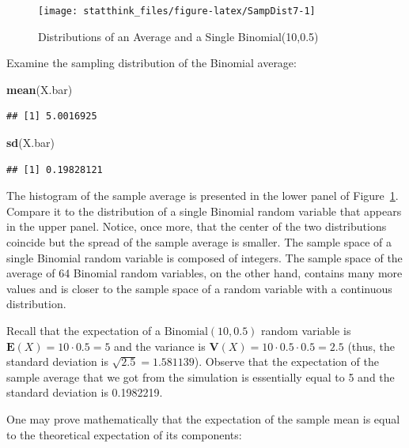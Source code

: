 \documentclass[]{krantz}
\makeatletter
\newenvironment{Shaded}{\begin{snugshade}}{\end{snugshade}}
\newcommand{\KeywordTok}[1]{\textcolor[rgb]{0.13,0.29,0.53}{\textbf{#1}}}
\newcommand{\NormalTok}[1]{#1}
\newcommand{\Expec}{\mathbf{E}}
\newcommand{\Var}{\mathbf{V}}
\newenvironment{kframe}{%
\medskip{}
\setlength{\fboxsep}{.8em}
 \def\at@end@of@kframe{}%
 \ifinner\ifhmode%
  \def\at@end@of@kframe{\end{minipage}}%
  \begin{minipage}{\columnwidth}%
 \fi\fi%
 \def\FrameCommand##1{\hskip\@totalleftmargin \hskip-\fboxsep
 \colorbox{shadecolor}{##1}\hskip-\fboxsep
     \hskip-\linewidth \hskip-\@totalleftmargin \hskip\columnwidth}%
 \MakeFramed {\advance\hsize-\width
   \@totalleftmargin\z@ \linewidth\hsize
   \@setminipage}}%
 {\par\unskip\endMakeFramed%
 \at@end@of@kframe}
\renewenvironment{Shaded}{\begin{kframe}}{\end{kframe}}
\theoremstyle{definition}
\theoremstyle{definition}
\theoremstyle{definition}
\theoremstyle{remark}
\makeatother
\begin{document}
\begin{figure}

{\centering \texttt{[image: statthink\_files/figure-latex/SampDist7-1]} 

}

\caption{Distributions of an Average and a Single Binomial(10,0.5)}\label{fig:SampDist7}
\end{figure}

Examine the sampling distribution of the Binomial average:

\begin{Shaded}
\begin{Highlighting}[]
\KeywordTok{mean}\NormalTok{(X.bar)}
\end{Highlighting}
\end{Shaded}

\begin{verbatim}
## [1] 5.0016925
\end{verbatim}

\begin{Shaded}
\begin{Highlighting}[]
\KeywordTok{sd}\NormalTok{(X.bar)}
\end{Highlighting}
\end{Shaded}

\begin{verbatim}
## [1] 0.19828121
\end{verbatim}

The histogram of the sample average is presented in the lower panel of
Figure~\ref{fig:SampDist7}. Compare it to the distribution of a single
Binomial random variable that appears in the upper panel. Notice, once
more, that the center of the two distributions coincide but the spread
of the sample average is smaller. The sample space of a single Binomial
random variable is composed of integers. The sample space of the average
of 64 Binomial random variables, on the other hand, contains many more
values and is closer to the sample space of a random variable with a
continuous distribution.

Recall that the expectation of a \(\mathrm{Binomial}(10,0.5)\) random
variable is \(\Expec(X) = 10 \cdot 0.5 = 5\) and the variance is
\(\Var(X) = 10 \cdot 0.5 \cdot 0.5 = 2.5\) (thus, the standard deviation
is \(\sqrt{2.5} = 1.581139\)). Observe that the expectation of the sample
average that we got from the simulation is essentially equal to 5 and
the standard deviation is 0.1982219.

One may prove mathematically that the expectation of the sample mean is
equal to the theoretical expectation of its components:
\end{document}

